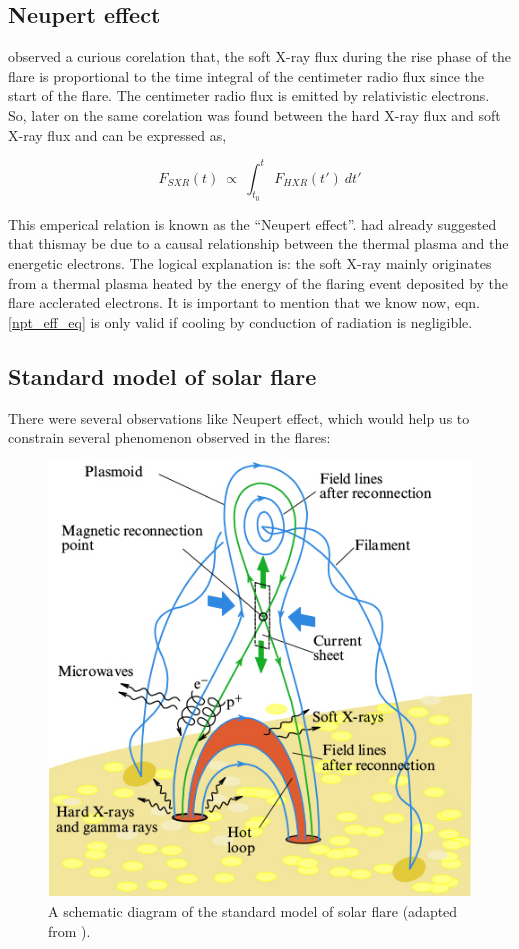 \subsection{Neupert effect}\label{npt_eff}

\cite{neupert68} observed a curious corelation that, the soft X-ray flux during the rise phase of the flare is proportional to the time integral of the centimeter radio flux since the start of the flare. The centimeter radio flux is emitted by relativistic electrons. So, later on the same corelation was found between the hard X-ray flux and soft X-ray flux and can be expressed as,

\begin{equation}\label{npt_eff_eq}
    F_{SXR}(t)~\propto~\int_{t_{0}}^{t}~F_{HXR}(t')~dt'
\end{equation}

This emperical relation is known as the ``Neupert effect''. \cite{neupert68} had already suggested that thismay be due to a causal relationship between the thermal plasma and the energetic electrons. The logical explanation is: the soft X-ray mainly originates from a thermal plasma heated by the energy of the flaring event deposited by the flare acclerated electrons. It is important to mention that we know now, eqn.\ref{npt_eff_eq} is only valid if cooling by conduction of radiation is negligible.

\subsection{Standard model of solar flare}\label{sol_flr_std_mod}

There were several observations like Neupert effect, which would help us to constrain several phenomenon observed in the flares:

\begin{figure}[h!]
    \centering
    \includegraphics[width=0.5\linewidth]{Figures/phu_63_8_818_f2.jpg}
    \caption{A schematic diagram of the standard model of solar flare (adapted from \cite{lysenko20}).}
\end{figure}

